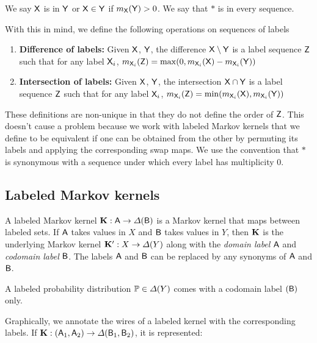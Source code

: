 We say $\mathsf{X}$ is in $\mathsf{Y}$ or $\mathsf{X}\in \mathsf{Y}$ if $m_{\mathsf{X}}(\mathsf{Y})>0$. We say that $*$ is in every sequence.

With this in mind, we define the following operations on sequences of labels

\begin{enumerate}
	\item \textbf{Difference of labels:} Given $\mathsf{X}$, $\mathsf{Y}$, the difference $\mathsf{X}\setminus \mathsf{Y}$ is a label sequence $\mathsf{Z}$ such that for any label $\mathsf{X}_i$, $m_{\mathsf{X}_i}(\mathsf{Z}) = \max(0,m_{\mathsf{X}_i}(\mathsf{X})-m_{\mathsf{X}_i}(\mathsf{Y}))$
	\item \textbf{Intersection of labels:} Given $\mathsf{X}$, $\mathsf{Y}$, the intersection $\mathsf{X}\cap \mathsf{Y}$ is a label sequence $\mathsf{Z}$ such that for any label $\mathsf{X}_i$, $m_{\mathsf{X}_i}(\mathsf{Z}) = \min(m_{\mathsf{X}_i}(\mathsf{X}),m_{\mathsf{X}_i}(\mathsf{Y}))$
\end{enumerate}

These definitions are non-unique in that they do not define the order of $\mathsf{Z}$. This doesn't cause a problem because we work with labeled Markov kernels that we define to be equivalent if one can be obtained from the other by permuting its labels and applying the corresponding swap maps. We use the convention that $*$ is synonymous with a sequence under which every label has multiplicity 0.

\subsection{Labeled Markov kernels}\label{sec:labeled_kernels}


A labeled Markov kernel $\mathbf{K}:\mathsf{A}\to \Delta(\mathsf{B})$ is a Markov kernel that maps between labeled sets. If $\mathsf{A}$ takes values in $X$ and $\mathsf{B}$ takes values in $Y$, then $\mathbf{K}$ is the underlying Markov kernel $\mathbf{K'}:X\to \Delta(Y)$ along with the \emph{domain label} $\mathsf{A}$ and \emph{codomain label} $\mathsf{B}$. The labels $\mathsf{A}$ and $\mathsf{B}$ can be replaced by any synonyms of $\mathsf{A}$ and $\mathsf{B}$.

A labeled probability distribution $\mathbb{P}\in\Delta(Y)$ comes with a codomain label $(\mathsf{B})$ only.

Graphically, we annotate the wires of a labeled kernel with the corresponding labels. If $\mathbf{K}:(\mathsf{A}_1,\mathsf{A}_2)\to \Delta(\mathsf{B}_1,\mathsf{B}_2)$, it is represented:

